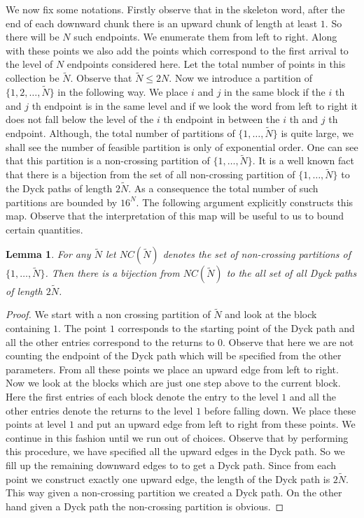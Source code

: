 \documentclass[12pt]{article}
\numberwithin{equation}{section}
\newtheorem{lemma}{Lemma}[section]
\numberwithin{equation}{section}
\theoremstyle{definition}
\renewcommand{\1}{\bf 1}
\begin{document}
We now fix some notations. Firstly observe that in the skeleton word, after the end of each downward chunk there is an upward chunk of length at least $1$. So there will be $N$ such endpoints. We enumerate them from left to right. Along with these points we also add the points which correspond to the first arrival to the level of $N$ endpoints considered here. Let the total number of points in this collection be $\tilde{N}$. Observe that $\tilde{N}\le 2N$. Now we introduce a partition of $\{ 1,2,\ldots, \tilde{N} \}$ in the following way. We place $i$ and $j$ in the same block if the $i$ th and $j$ th endpoint is in the same level and if we look the word from left to right it does not fall below the level of the $i$ th endpoint in between the $i$ th and $j$ th endpoint. Although, the total number of partitions of $\{ 1,\ldots ,\tilde{N} \}$ is quite large, we shall see the number of feasible partition is only of exponential order. One can see that this partition is a non-crossing partition of $\{1,\ldots , \tilde{N} \}$. It is a well known fact that there is a bijection from the set of all non-crossing partition of $\{1,\ldots , \tilde{N}  \}$ to the Dyck paths of length $2\tilde{N}$. As a consequence the total number of such partitions are bounded by $16^{N}$. The following argument explicitly constructs this map. Observe that the interpretation of this map will be useful to us to bound certain quantities. 
\begin{lemma}\label{lem:noncrossing}
For any $\tilde{N}$ let $NC(\tilde{N})$ denotes the set of non-crossing partitions of $\{1,\ldots , \tilde{N} \}$. Then there is a bijection from $NC(\tilde{N})$ to the all set of all Dyck paths of length $2\tilde{N}$.
\end{lemma}
\begin{proof}
We start with a non crossing partition of $\tilde{N}$ and look at the block containing $1$. The point $1$ corresponds to the starting point of the Dyck path and all the other entries correspond to the returns to $0$. Observe that here we are not counting the endpoint of the Dyck path which will be specified from the other parameters. From all these points we place an upward edge from left to right. Now we look at the blocks which are just one step above to the current block. Here the first entries of each block denote the entry to the level $1$ and all the other entries denote the returns to the level $1$ before falling down. We place these points at level $1$ and put an upward edge from left to right from these points. We continue in this fashion until we run out of choices. Observe that by performing this procedure, we have specified all the upward edges in the Dyck path. So we fill up the remaining downward edges to to get a Dyck path. Since from each point we construct exactly one upward edge, the length of the Dyck path is $2\tilde{N}$.  This way given a non-crossing partition we created a Dyck path. On the other hand given a Dyck path the non-crossing partition is obvious.
\end{proof}
\end{document}
